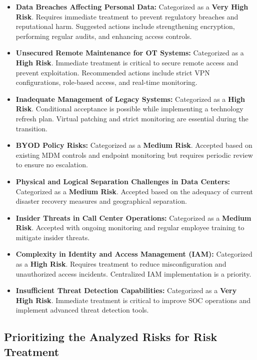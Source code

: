 \begin{itemize}
    \item \textbf{Data Breaches Affecting Personal Data:} Categorized as a \textbf{Very High Risk}. Requires immediate treatment to prevent regulatory breaches and reputational harm. Suggested actions include strengthening encryption, performing regular audits, and enhancing access controls.
    \item \textbf{Unsecured Remote Maintenance for OT Systems:} Categorized as a \textbf{High Risk}. Immediate treatment is critical to secure remote access and prevent exploitation. Recommended actions include strict VPN configurations, role-based access, and real-time monitoring.
    \item \textbf{Inadequate Management of Legacy Systems:} Categorized as a \textbf{High Risk}. Conditional acceptance is possible while implementing a technology refresh plan. Virtual patching and strict monitoring are essential during the transition.
    \item \textbf{BYOD Policy Risks:} Categorized as a \textbf{Medium Risk}. Accepted based on existing MDM controls and endpoint monitoring but requires periodic review to ensure no escalation.
    \item \textbf{Physical and Logical Separation Challenges in Data Centers:} Categorized as a \textbf{Medium Risk}. Accepted based on the adequacy of current disaster recovery measures and geographical separation.
    \item \textbf{Insider Threats in Call Center Operations:} Categorized as a \textbf{Medium Risk}. Accepted with ongoing monitoring and regular employee training to mitigate insider threats.
    \item \textbf{Complexity in Identity and Access Management (IAM):} Categorized as a \textbf{High Risk}. Requires treatment to reduce misconfiguration and unauthorized access incidents. Centralized IAM implementation is a priority.
    \item \textbf{Insufficient Threat Detection Capabilities:} Categorized as a \textbf{Very High Risk}. Immediate treatment is critical to improve SOC operations and implement advanced threat detection tools.
\end{itemize}

\subsection{Prioritizing the Analyzed Risks for Risk Treatment}


